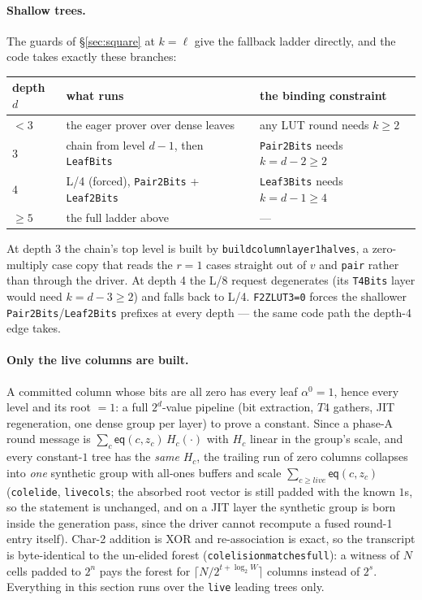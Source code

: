 \documentclass[11pt]{article}
\newcommand{\eq}{\mathsf{eq}}
\newcommand{\code}[1]{{\def\_{\textunderscore\allowbreak}\texttt{#1}}}
\theoremstyle{definition}
\begin{document}
\paragraph{Shallow trees.}
The guards of \S\ref{sec:square} at $k = \ell$ give the fallback ladder
directly, and the code takes exactly these branches:
\begin{center}
\small
\begin{tabular}{lll}
\toprule
depth $d$ & what runs & the binding constraint \\
\midrule
$< 3$ & the eager prover over dense leaves
      & any LUT round needs $k \ge 2$ \\
$3$   & chain from level $d{-}1$, then \code{LeafBits}
      & \code{Pair2Bits} needs $k = d{-}2 \ge 2$ \\
$4$   & L/4 (forced), \code{Pair2Bits} + \code{Leaf2Bits}
      & \code{Leaf3Bits} needs $k = d{-}1 \ge 4$ \\
$\ge 5$ & the full ladder above & --- \\
\bottomrule
\end{tabular}
\end{center}
At depth 3 the chain's top level is built by
\code{build\_column\_layer1\_halves}, a zero-multiply case copy that
reads the $r = 1$ cases straight out of $v$ and \code{pair} rather than
through the driver.  At depth 4 the L/8 request degenerates (its
\code{T4Bits} layer would need $k = d-3 \ge 2$) and falls back to L/4.
\code{F2Z\_LUT3=0} forces the shallower \code{Pair2Bits}/\code{Leaf2Bits}
prefixes at every depth --- the same code path the depth-4 edge takes.

\paragraph{Only the live columns are built.}
A committed column whose bits are all zero has every leaf $\alpha^0 = 1$,
hence every level and its root $= 1$: a full $2^d$-value pipeline
(bit extraction, $T4$ gathers, JIT regeneration, one dense group per
layer) to prove a constant.  Since a phase-A round message is
$\sum_c \eq(c, z_c)\,H_c(\cdot)$ with $H_c$ linear in the group's scale,
and every constant-$1$ tree has the \emph{same} $H_c$, the trailing run
of zero columns collapses into \emph{one} synthetic group with all-ones
buffers and scale $\sum_{c \ge \mathit{live}} \eq(c, z_c)$
(\code{col\_elide}, \code{live\_cols}; the absorbed root vector is still
padded with the known $1$s, so the statement is unchanged, and on a JIT
layer the synthetic group is born inside the generation pass, since the
driver cannot recompute a fused round-1 entry itself).  Char-2 addition
is XOR and re-association is exact, so the transcript is byte-identical
to the un-elided forest (\code{col\_elision\_matches\_full}): a witness
of $N$ cells padded to $2^n$ pays the forest for
$\lceil N/2^{t + \log_2 W}\rceil$ columns instead of $2^s$.  Everything
in this section runs over the \code{live} leading trees only.
\end{document}
